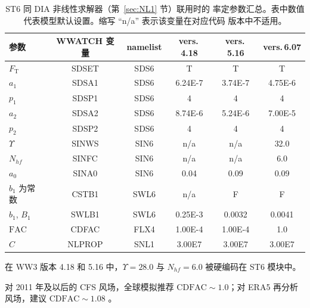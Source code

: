 \begin{table} \begin{center}
\footnotesize
\begin{threeparttable}
\begin{tabular}{|l|c|c|c|c|c|} \hline \hline
参数              &  WWATCH 变量 & namelist &  vers.\,4.18 & vers.\,5.16 & vers.\,6.07 \\
\hline
  $F_{\mathrm{T}}$ &  SDSET       & SDS6     &  T       &  T         & T          \\
  $a_1$            &  SDSA1       & SDS6     & 6.24E-7  & 3.74E-7    & 4.75E-6    \\
  $p_1$            &  SDSP1       & SDS6     &  4       &  4         & 4          \\
  $a_2$            &  SDSA2       & SDS6     & 8.74E-6  & 5.24E-6    & 7.00E-5    \\
  $p_2$            &  SDSP2       & SDS6     &  4       &  4         & 4          \\
\hline
  $\Upsilon$\tnote{\textdagger}       &  SINWS       & SIN6     & n/a      & n/a        & 32.0       \\
  $N_{hf}$\tnote{\textdagger}         &  SINFC       & SIN6     & n/a      & n/a        & 6.0        \\
  $a_0$            &  SINA0       & SIN6     & 0.04     & 0.09       & 0.09       \\
  $b_1$ 为常数     &  CSTB1       & SWL6     & n/a      &  F         & F          \\
  $b_1$, $B_1$     &  SWLB1       & SWL6     & 0.25E-3  & 0.0032     & 0.0041     \\
  $\mathrm{FAC}$   &  CDFAC       & FLX4     & 1.00E-4  & 1.00E-4    & 1.0\tnote{\textdaggerdbl}        \\
\hline
  $C$              &  NLPROP      & SNL1     & 3.00E7   &  3.00E7    & 3.00E7    \\
 \hline \hline
\end{tabular}
\begin{tablenotes}
	\item[\textdagger] 在 WW3 版本 4.18 和 5.16 中，$\Upsilon = 28.0$
            与 $N_{hf} = 6.0$ 被硬编码在 {\code ST6} 模块中。
    \item[\textdaggerdbl] 对 2011 年及以后的 CFS 风场，全球模拟推荐
            $\mathrm{CDFAC} \sim 1.0$；对 ERA5 再分析风场，建议
            $\mathrm{CDFAC} \sim 1.08$ \citep{Liu2019, Liu2021}。
\end{tablenotes}
\end{threeparttable} \end{center}
\caption{{\code ST6} 同 {\code DIA} 非线性求解器（第~\ref{sec:NL1} 节）联用时的
         率定参数汇总。表中数值代表模型默认设置。缩写 ``n/a'' 表示该变量在对应代码
         版本中不适用。}
\label{tab:ST601} \botline \end{table}

